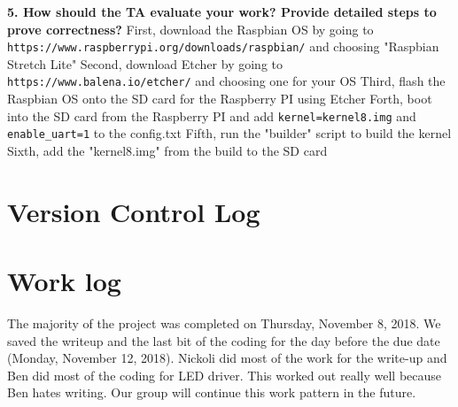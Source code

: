 \documentclass[10pt,english]{article}
\begin{document}
\nonindent \textbf{5. How should the TA evaluate your work? Provide detailed steps to prove correctness?}
First, download the Raspbian OS by going to \verb|https://www.raspberrypi.org/downloads/raspbian/| and choosing "Raspbian Stretch Lite"
Second, download Etcher by going to \verb|https://www.balena.io/etcher/| and choosing one for your OS
Third, flash the Raspbian OS onto the SD card for the Raspberry PI using Etcher
Forth, boot into the SD card from the Raspberry PI and add \verb|kernel=kernel8.img| and \verb|enable_uart=1| to the config.txt 
Fifth, run the "builder" script to build the kernel
Sixth, add the "kernel8.img" from the build to the SD card  \\

\section{Version Control Log}



\section{Work log}


The majority of the project was completed on Thursday, November 8, 2018. We saved the writeup and the last bit of the coding for the day before the due date (Monday, November 12, 2018). Nickoli did most of the work for the write-up and Ben did most of the coding for LED driver. This worked out really well because Ben hates writing. Our group will continue this work pattern in the future. 
\end{document}
